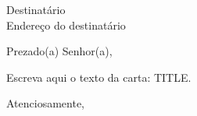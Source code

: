 \documentclass[a4paper,12pt]{letter}
\begin{document}
\begin{letter}{Destinatário \\ Endereço do destinatário}

\opening{Prezado(a) Senhor(a),}

Escreva aqui o texto da carta: {{TITLE}}.

\closing{Atenciosamente,}

\end{letter}
\end{document}
